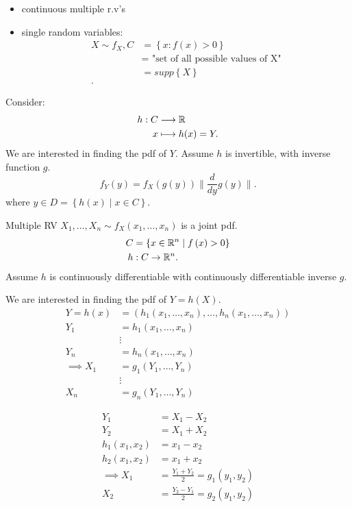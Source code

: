 
\begin{itemize}
	\item continuous multiple r.v's
	\item single random variables:
		\begin{align*}
			X \sim f_{X}, C &= \left\{ x: f\left( x \right) > 0 \right\}  \\
			&= \text{ "set of all possible values of X"} \\
			 &= supp\left\{ X \right\}  \\
		.\end{align*}
\end{itemize}

Consider: \begin{align*}
	h : C &\longrightarrow \mathbb{R} \\
	x &\longmapsto h (x) = Y
.\end{align*}
We are interested in finding the pdf of $Y$. Assume $h$ is invertible, with inverse function $g$. 
\[
	f_{Y}\left( y \right) = f_{X}\left( g\left( y \right)  \right)  \|\frac{d}{dy} g\left( y \right) \|
.\] where $y \in D = \left\{ h\left( x \right)  \mid x \in  C \right\} $. 

Multiple RV $X_{1} , \ldots , X_{n} \sim f_{X}\left( x_{1} , \ldots , x_{n} \right) $ is a joint pdf. 
\begin{align*}
	C &= \left\{ x \in  \mathbb{R}^{n} \mid f\left( x  \right) > 0 \right\}  \\
	h  &: C \to \mathbb{R}^{n}
.\end{align*}
Assume $h$ is continuously differentiable with continuously differentiable inverse $g$.

We are interested in finding the pdf of $Y = h\left( X \right) $. 
\begin{align*}
Y =  	h\left( x \right) &= \left(h_{1}\left( x_{1} , \ldots  , x_{n} \right)  , \ldots , h_{n}\left( x_{1} , \ldots , x_{n} \right) \right)\\
	Y_1 &=  h_{1}\left( x_{1} , \ldots  , x_{n} \right)\\
	    &\vdots\\
	  Y_{n} &= h_{n}\left( x_{1} , \ldots , x_{n} \right) \\
	  \implies X_1 &= g_1 \left( Y_{1} , \ldots , Y_{n} \right)  \\
		       &\vdots \\
		        X_{n} &= g_{n}\left( Y_{1} , \ldots , Y_{n} \right) 
  \end{align*}
  \begin{eg}
	  \begin{align*}
	  	Y_1 &= X_1 - X_2\\
	Y_2 &= X_1 + X_2\\
	h_1\left( x_1, x_2 \right) &= x_1 - x_2 \\
	h_2 \left( x_1, x_2  \right) &= x_1 + x_2  \\
	\implies X_1 &= \frac{Y_1 + Y_2}{2} = g_1\left( y_1, y_2 \right)  \\
	X_2 &= \frac{Y_2 - Y_1}{2} = g_2\left( y_1, y_2 \right) 
	  \end{align*}
  \end{eg}

